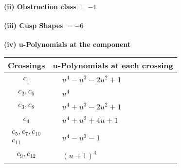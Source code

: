\documentclass[1p]{elsarticle_modified}
\theoremstyle{definition}
\begin{document}
\flushleft \textbf{(ii) Obstruction class $= -1$}\\~\\
\flushleft \textbf{(iii) Cusp Shapes $= -6$}\\~\\
\newpage\renewcommand{\arraystretch}{1}
\flushleft \textbf{(iv) u-Polynomials at the component}\newline \\
\begin{tabular}{m{50pt}|m{274pt}}
Crossings & \hspace{64pt}u-Polynomials at each crossing \\
\hline $$\begin{aligned}c_{1}\end{aligned}$$&$\begin{aligned}
&u^4- u^3-2 u^2+1
\end{aligned}$\\
\hline $$\begin{aligned}c_{2},c_{6}\end{aligned}$$&$\begin{aligned}
&u^4
\end{aligned}$\\
\hline $$\begin{aligned}c_{3},c_{8}\end{aligned}$$&$\begin{aligned}
&u^4+u^3-2 u^2+1
\end{aligned}$\\
\hline $$\begin{aligned}c_{4}\end{aligned}$$&$\begin{aligned}
&u^4+u^2+4 u+1
\end{aligned}$\\
\hline $$\begin{aligned}c_{5},c_{7},c_{10}\\c_{11}\end{aligned}$$&$\begin{aligned}
&u^4- u^3-1
\end{aligned}$\\
\hline $$\begin{aligned}c_{9},c_{12}\end{aligned}$$&$\begin{aligned}
&(u+1)^4
\end{aligned}$\\
\hline
\end{tabular}\\~\\
\end{document}
